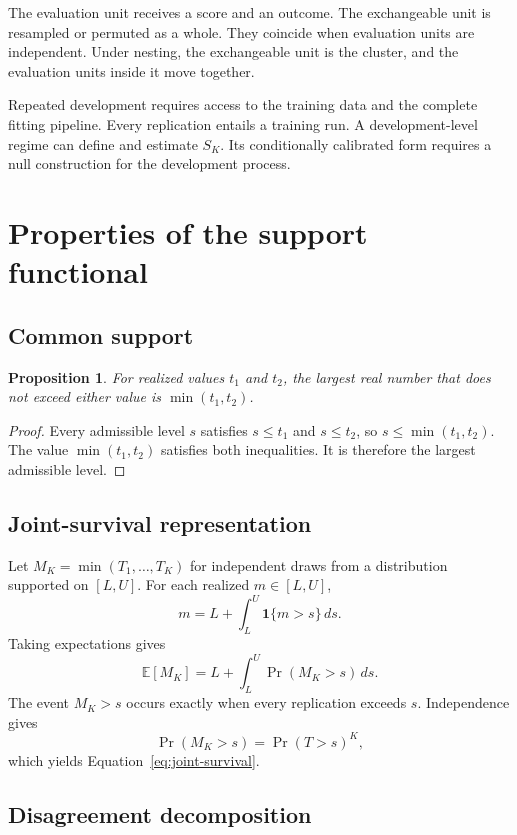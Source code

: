\documentclass[11pt]{article}
\newcommand{\E}{\mathbb{E}}
\newtheorem{proposition}{Proposition}
\theoremstyle{remark}
\begin{document}
The evaluation unit receives a score and an outcome. The exchangeable unit is resampled or permuted as a whole. They coincide when evaluation units are independent. Under nesting, the exchangeable unit is the cluster, and the evaluation units inside it move together.

Repeated development requires access to the training data and the complete fitting pipeline. Every replication entails a training run. A development-level regime can define and estimate $S_K$. Its conditionally calibrated form requires a null construction for the development process.

\section{Properties of the support functional}
\label{app:properties}

\subsection{Common support}

\begin{proposition}
For realized values $t_1$ and $t_2$, the largest real number that does not exceed either value is $\min(t_1,t_2)$.
\end{proposition}

\begin{proof}
Every admissible level $s$ satisfies $s\leq t_1$ and $s\leq t_2$, so $s\leq\min(t_1,t_2)$. The value $\min(t_1,t_2)$ satisfies both inequalities. It is therefore the largest admissible level.
\end{proof}

\subsection{Joint-survival representation}
\label{app:joint-survival-proof}

Let $M_K=\min(T_1,\ldots,T_K)$ for independent draws from a distribution supported on $[L,U]$. For each realized $m\in[L,U]$,
\[
m
=
L+\int_L^U\mathbf{1}\{m>s\}\,ds.
\]
Taking expectations gives
\[
\E[M_K]
=
L+\int_L^U\Pr(M_K>s)\,ds.
\]
The event $M_K>s$ occurs exactly when every replication exceeds $s$. Independence gives
\[
\Pr(M_K>s)=\Pr(T>s)^K,
\]
which yields Equation~\eqref{eq:joint-survival}.

\subsection{Disagreement decomposition}
\end{document}
